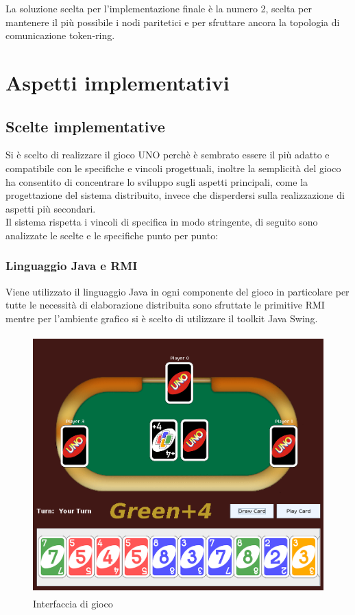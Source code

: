 \documentclass[10pt,a4paper]{article}
\begin{document}
La soluzione scelta per l'implementazione finale è la numero 2, scelta per mantenere il più possibile i nodi paritetici e per sfruttare ancora la topologia di comunicazione token-ring. 

\section{Aspetti implementativi}
\subsection{Scelte implementative}
Si è scelto di realizzare il gioco UNO perchè è sembrato essere il più adatto e compatibile con le specifiche e vincoli progettuali, inoltre la semplicità del gioco ha consentito di concentrare lo sviluppo sugli aspetti principali, come la progettazione del sistema distribuito, invece che disperdersi sulla realizzazione di aspetti più secondari.\\
Il sistema rispetta i vincoli di specifica in modo stringente, di seguito sono analizzate le scelte e le specifiche punto per punto:

\subsubsection{Linguaggio Java e RMI}
Viene utilizzato il linguaggio Java in ogni componente del gioco in particolare per tutte le necessità di elaborazione distribuita sono sfruttate le primitive RMI mentre per l'ambiente grafico si è scelto di utilizzare il toolkit Java Swing.

\begin{figure}[H]
\begin{center}
\includegraphics[height=10cm, keepaspectratio]{Selection_011.png}
\caption{Interfaccia di gioco}
\end{center}
\end{figure}
\end{document}
